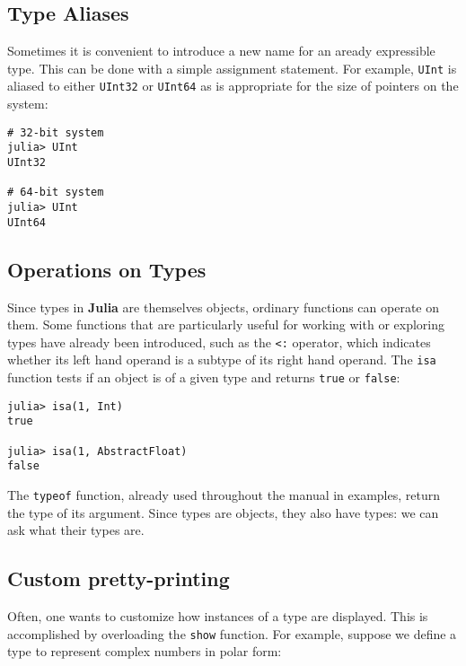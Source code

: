 \documentclass[
]{article}
\begin{document}
\hypertarget{type-aliases}{%
\subsection{Type Aliases}\label{type-aliases}}

Sometimes it is convenient to introduce a new name for an aready
expressible type. This can be done with a simple assignment statement.
For example, \texttt{UInt} is aliased to either \texttt{UInt32} or
\texttt{UInt64} as is appropriate for the size of pointers on the
system:

\begin{verbatim}
# 32-bit system
julia> UInt
UInt32

# 64-bit system
julia> UInt
UInt64
\end{verbatim}

\hypertarget{operations-on-types}{%
\subsection{Operations on Types}\label{operations-on-types}}

Since types in \textbf{Julia} are themselves objects, ordinary functions
can operate on them. Some functions that are particularly useful for
working with or exploring types have already been introduced, such as
the \texttt{\textless{}:} operator, which indicates whether its left
hand operand is a subtype of its right hand operand. The \texttt{isa}
function tests if an object is of a given type and returns \texttt{true}
or \texttt{false}:

\begin{verbatim}
julia> isa(1, Int)
true

julia> isa(1, AbstractFloat)
false
\end{verbatim}

The \texttt{typeof} function, already used throughout the manual in
examples, return the type of its argument. Since types are objects, they
also have types: we can ask what their types are.

\hypertarget{custom-pretty-printing}{%
\subsection{Custom pretty-printing}\label{custom-pretty-printing}}

Often, one wants to customize how instances of a type are displayed.
This is accomplished by overloading the \texttt{show} function. For
example, suppose we define a type to represent complex numbers in polar
form:
\end{document}
